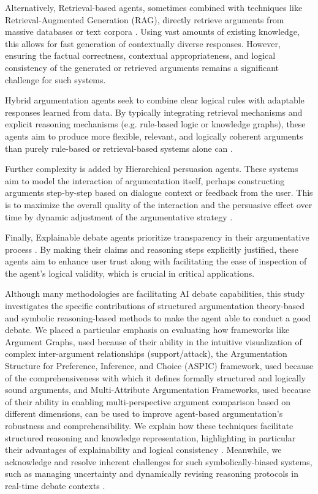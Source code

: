 \documentclass[conference]{IEEEtran}
\begin{document}
Alternatively, Retrieval-based agents, sometimes combined with techniques like Retrieval-Augmented Generation (RAG), directly retrieve arguments from massive databases or text corpora \cite{kulatska2019arguebot}. Using vast amounts of existing knowledge, this allows for fast generation of contextually diverse responses. However, ensuring the factual correctness, contextual appropriateness, and logical consistency of the generated or retrieved arguments remains a significant challenge for such systems.

Hybrid argumentation agents seek to combine clear logical rules with adaptable responses learned from data. By typically integrating retrieval mechanisms and explicit reasoning mechanisms (e.g. rule-based logic or knowledge graphs), these agents aim to produce more flexible, relevant, and logically coherent arguments than purely rule-based or retrieval-based systems alone can \cite{kulatska2019arguebot}.

Further complexity is added by Hierarchical persuasion agents. These systems aim to model the interaction of argumentation itself, perhaps constructing arguments step-by-step based on dialogue context or feedback from the user. This is to maximize the overall quality of the interaction and the persuasive effect over time by dynamic adjustment of the argumentative strategy \cite{sakai2020hierarchical}.

Finally, Explainable debate agents prioritize transparency in their argumentative process \cite{b13}. By making their claims and reasoning steps explicitly justified, these agents aim to enhance user trust along with facilitating the ease of inspection of the agent's logical validity, which is crucial in critical applications.

Although many methodologies are facilitating AI debate capabilities, this study investigates the specific contributions of structured argumentation theory-based and symbolic reasoning-based methods to make the agent able to conduct a good debate. We placed a particular emphasis on evaluating how frameworks like Argument Graphs, used because of their ability in the intuitive visualization of complex inter-argument relationships (support/attack), the Argumentation Structure for Preference, Inference, and Choice (ASPIC) framework, used because of the comprehensiveness with which it defines formally structured and logically sound arguments, and Multi-Attribute Argumentation Frameworks, used because of their ability in enabling multi-perspective argument comparison based on different dimensions, can be used to improve agent-based argumentation's robustness and comprehensibility. We explain how these techniques facilitate structured reasoning and knowledge representation, highlighting in particular their advantages of explainability and logical consistency \cite{b11}. Meanwhile, we acknowledge and resolve inherent challenges for such symbolically-biased systems, such as managing uncertainty and dynamically revising reasoning protocols in real-time debate contexts \cite{b11}.
\end{document}
